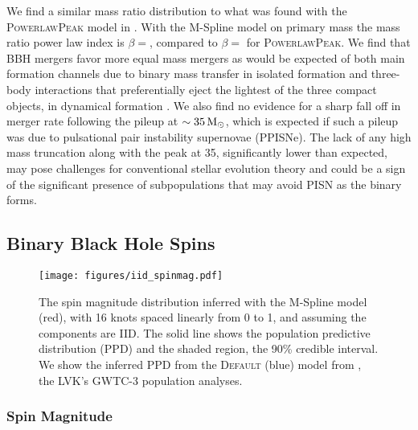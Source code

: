 We find a similar mass ratio distribution to what was found with the \textsc{PowerlawPeak} model in \citet{o3b_astro_dist}. 
With the M-Spline model on primary mass the mass ratio power law index is $\beta = $\result{$\CIPlusMinus{\macros[MSplineIIDCompSpins][beta]}$}, 
compared to $\beta = $\result{$\CIPlusMinus{\macros[PLPeak][beta]}$} for \textsc{PowerlawPeak}. We find that BBH mergers favor more equal mass mergers
as would be expected of both main formation channels due to binary mass transfer in isolated formation  
and three-body interactions that preferentially eject the lightest of the three compact objects, in dynamical formation . 
We also find no evidence for a sharp fall off in merger rate following the pileup at $\sim35\,{\rm M}_\odot$, which is expected if such a pileup was due 
to pulsational pair instability supernovae (PPISNe). The lack of any high mass truncation along with the peak at 35\msun, significantly lower 
than expected, may pose challenges for conventional stellar evolution theory and could be a sign of the significant 
presence of subpopulations that may avoid PISN as the binary forms. 

\subsection{Binary Black Hole Spins} \label{sec:spin_dist}

\begin{figure}
    \begin{centering}    
        \texttt{[image: figures/iid\_spinmag.pdf]}
        \caption{The spin magnitude distribution inferred with the M-Spline model (red), with 16 knots spaced linearly from 0 to 1, and 
        assuming the components are IID. The solid line shows the population predictive distribution (PPD) and the shaded region, the 90\% credible interval. 
        We show the inferred PPD from the \textsc{Default} (blue) model from \citet{o3b_astro_dist}, the LVK's GWTC-3 population analyses.}
        \label{fig:iid_spinmag_dist}
    \end{centering}
\end{figure}

\subsubsection{Spin Magnitude}

